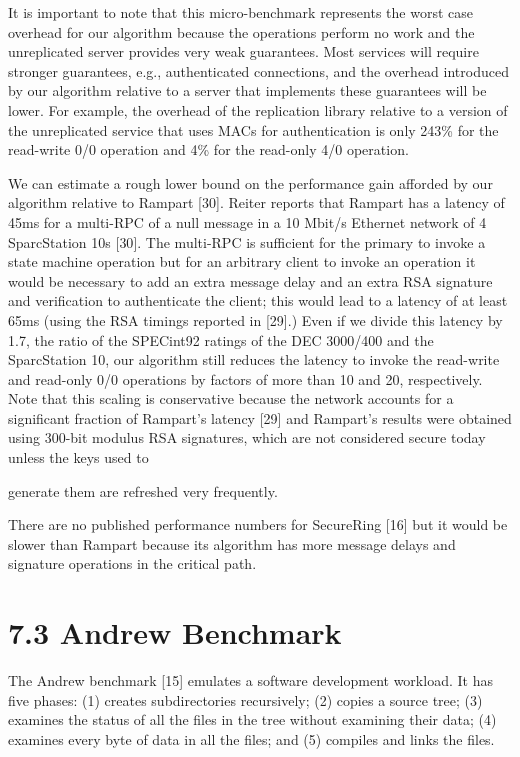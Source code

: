 \documentclass[
]{article}
\begin{document}
It is important to note that this micro-benchmark represents the worst
case overhead for our algorithm because the operations perform no work
and the unreplicated server provides very weak guarantees. Most services
will require stronger guarantees, e.g., authenticated connections, and
the overhead introduced by our algorithm relative to a server that
implements these guarantees will be lower. For example, the overhead of
the replication library relative to a version of the unreplicated
service that uses MACs for authentication is only 243\% for the
read-write 0/0 operation and 4\% for the read-only 4/0 operation.

We can estimate a rough lower bound on the performance gain afforded by
our algorithm relative to Rampart {[}30{]}. Reiter reports that Rampart
has a latency of 45ms for a multi-RPC of a null message in a 10 Mbit/s
Ethernet network of 4 SparcStation 10s {[}30{]}. The multi-RPC is
sufficient for the primary to invoke a state machine operation but for
an arbitrary client to invoke an operation it would be necessary to add
an extra message delay and an extra RSA signature and verification to
authenticate the client; this would lead to a latency of at least 65ms
(using the RSA timings reported in {[}29{]}.) Even if we divide this
latency by 1.7, the ratio of the SPECint92 ratings of the DEC 3000/400
and the SparcStation 10, our algorithm still reduces the latency to
invoke the read-write and read-only 0/0 operations by factors of more
than 10 and 20, respectively. Note that this scaling is conservative
because the network accounts for a significant fraction of Rampart's
latency {[}29{]} and Rampart's results were obtained using 300-bit
modulus RSA signatures, which are not considered secure today unless the
keys used to

generate them are refreshed very frequently.

There are no published performance numbers for SecureRing {[}16{]} but
it would be slower than Rampart because its algorithm has more message
delays and signature operations in the critical path.

\section{7.3 Andrew Benchmark}\label{andrew-benchmark}

The Andrew benchmark {[}15{]} emulates a software development workload.
It has five phases: (1) creates subdirectories recursively; (2) copies a
source tree; (3) examines the status of all the files in the tree
without examining their data; (4) examines every byte of data in all the
files; and (5) compiles and links the files.
\end{document}
